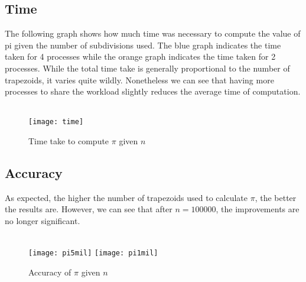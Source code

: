 \documentclass[a4paper]{article}
\begin{document}
\subsection{Time}
The following graph shows how much time was necessary to compute the value of pi given the number of subdivisions used. The blue graph indicates the time taken for 4 processes while the orange graph indicates the time taken for 2 processes. While the total time take is generally proportional to the number of trapezoids, it varies quite wildly. Nonetheless we can see that having more processes to share the workload slightly reduces the average time of computation. 
\\\\
\begin{figure}[h]
\caption{Time take to compute $\pi$ given $n$}
\centering
\texttt{[image: time]}
\end{figure}

\newpage
\subsection{Accuracy}
As expected, the higher the number of trapezoids used to calculate $\pi$, the better the results are. However, we can see that after $n=100000$, the improvements are no longer significant.  
\\\\

\begin{figure}[h]
\caption{Accuracy of $\pi$ given $n$}
\texttt{[image: pi5mil]}
\texttt{[image: pi1mil]}
\end{figure}
\end{document}
